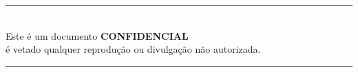 \pagebreak
\hspace{0pt}
\vfill
\begin{center}
\hfill\rule{\linewidth}{1pt} \\[4pt]
    Este é um documento \textbf{CONFIDENCIAL} \\
    é vetado qualquer reprodução ou divulgação não autorizada.\\[4pt]
    \hfill\rule{\linewidth}{1pt} \\[4pt]
\end{center}
\vfill
\hspace{0pt}
\pagebreak
